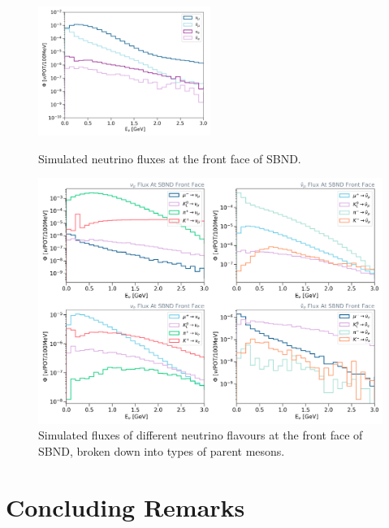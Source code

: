 \begin{figure}[hb!] 
\centering    
\includegraphics[width=0.5\textwidth]{BNB_combined_neutrino_flux}
\caption[Simulated Neutrino Fluxes at the Front Face of SBND]{
Simulated neutrino fluxes at the front face of SBND. 
}
\label{fig:BNB_combined_neutrino_flux}
\vspace{0.5cm}
\centering    
\includegraphics[width=1.0\textwidth]{BNB_neutrino_flux}
\caption[Simulated Neutrino Fluxes of Different Flavours at the Front Face of SBND]{
Simulated fluxes of different neutrino flavours at the front face of SBND, broken down into types of parent mesons.
}
\label{fig:BNB_neutrino_flux}
\end{figure}

\section{Concluding Remarks}
\label{sec:sbnd_conclude}

